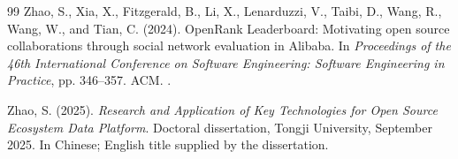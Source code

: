 \begin{thebibliography}{99}
Zhao, S., Xia, X., Fitzgerald, B., Li, X., Lenarduzzi, V., Taibi, D., Wang, R., Wang, W., and Tian, C. (2024).
OpenRank Leaderboard: Motivating open source collaborations through social network evaluation in Alibaba.
In \emph{Proceedings of the 46th International Conference on Software Engineering: Software Engineering in Practice}, pp. 346--357. ACM.
.

Zhao, S. (2025).
\emph{Research and Application of Key Technologies for Open Source Ecosystem Data Platform}.
Doctoral dissertation, Tongji University, September 2025. In Chinese; English title supplied by the dissertation.
\end{thebibliography}
\endgroup
